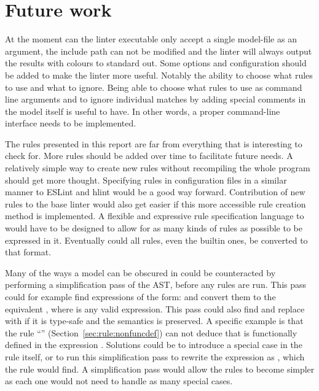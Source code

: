 \documentclass[a4paper,12pt]{article}
\newcommand{\mi}[1]{\mbox{\mzninline{#1}}}
\newcommand{\ruleref}[1]{``\nameref{sec:rule:#1}'' (Section~\ref{sec:rule:#1})}
\begin{document}
\section{Future work}
At the moment can the linter executable only accept a single model-file as an argument,
the include path can not be modified and the linter will always output the results with
colours to standard out.
Some options and configuration should be added to make the linter more useful. Notably
the ability to choose what rules to use and what to ignore. Being able to choose what
rules to use as command line arguments and to ignore individual matches by adding special
comments in the model itself is useful to have. In other words, a proper command-line
interface needs to be implemented.

The rules presented in this report are far from everything that is interesting to check
for. More rules should be added over time to facilitate future needs. A relatively simple
way to create new rules without recompiling the whole program should get more thought.
Specifying rules in configuration files in a similar manner to ESLint and hlint would be a
good way forward. Contribution of new rules to the base linter would also get easier if
this more accessible rule creation method is implemented. A flexible and expressive rule
specification language to would have to be designed to allow for as many kinds of rules as
possible to be expressed in it. Eventually could all rules, even the builtin ones, be
converted to that format.

Many of the ways a model can be obscured in could be counteracted by performing a
simplification pass of the AST, before any rules are run. This pass could for example find
expressions of the form: \mi{false \\/ a} and convert them to the equivalent \mi{a}, where
\mi{a} is any valid expression. This pass could also find \mi{[a]} and replace with \mi{a}
if it is type-safe and the semantics is preserved. A specific example is that the rule
\ruleref{nonfuncdef} can not deduce that \mi{a} is functionally defined in the expression
\mi{[a] = [b+1]}. Solutions could be to introduce a special case in the rule itself, or to
run this simplification pass to rewrite the expression as \mi{a = b+1}, which the rule
would find. A simplification pass would allow the rules to become simpler as each one
would not need to handle as many special cases.


%

\end{document}
